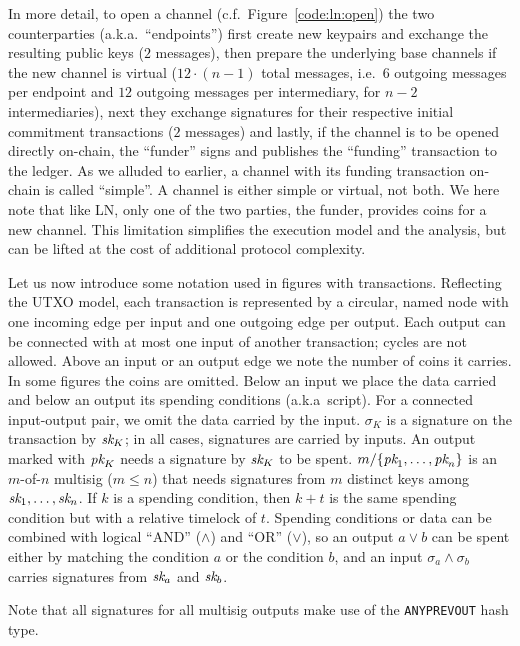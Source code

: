   In more detail, to open a channel (c.f.\ Figure~\ref{code:ln:open}) the two
  counterparties (a.k.a.\ ``endpoints'') first create new keypairs and exchange
  the resulting public keys ($2$ messages), then prepare the underlying base
  channels if the new channel is virtual ($12 \cdot (n-1)$ total messages, i.e.\
  $6$ outgoing messages per endpoint and $12$ outgoing messages per
  intermediary, for $n-2$ intermediaries), next they exchange signatures for
  their respective initial commitment transactions ($2$ messages) and lastly, if
  the channel is to be opened directly on-chain, the ``funder'' signs and publishes
  the ``funding'' transaction to the ledger. As we alluded to earlier, a channel
  with its funding transaction on-chain is called ``simple''. A channel is
  either simple or virtual, not both. We here note that like LN, only one of the
  two parties, the funder, provides coins for a new channel. This limitation
  simplifies the execution model and the analysis, but can be lifted at the cost
  of additional protocol complexity.

  Let us now introduce some notation used in figures with transactions.
  Reflecting the UTXO model, each transaction is represented by a circular,
  named node with one incoming edge per input and one outgoing edge per output.
  Each output can be connected with at most one input of another transaction;
  cycles are not allowed. Above an input or an output edge we note the number of
  coins it carries. In some figures the coins are omitted. Below an input we
  place the data carried and below an output its spending conditions (a.k.a\
  script). For
  a connected input-output pair, we omit the data carried by the input.
  $\sigma_K$ is a signature on the transaction by $\textit{sk}_{K}$; in all cases, signatures
  are carried by inputs. An output marked
  with $\textit{pk}_{K}$ needs a signature by $\textit{sk}_{K}$ to be spent. $m/\{\textit{pk}_{1}, \dots,
  \textit{pk}_{n}\}$ is an $m$-of-$n$ multisig ($m \leq n$) that needs signatures from
  $m$ distinct keys among $\textit{sk}_{1}, \dots, \textit{sk}_{n}$. If $k$ is a spending
  condition, then $k + t$ is the same spending condition but with a relative timelock
  of $t$. Spending conditions or data can be combined with logical ``AND''
  ($\wedge$) and ``OR'' ($\vee$), so an output $a \vee b$ can be spent either by
  matching the condition $a$ or the condition $b$, and an input $\sigma_a \wedge
  \sigma_b$ carries signatures from $\textit{sk}_{a}$ and $\textit{sk}_{b}$.

  Note that all signatures for all multisig outputs make use of the
  \texttt{ANYPREVOUT} hash type.

